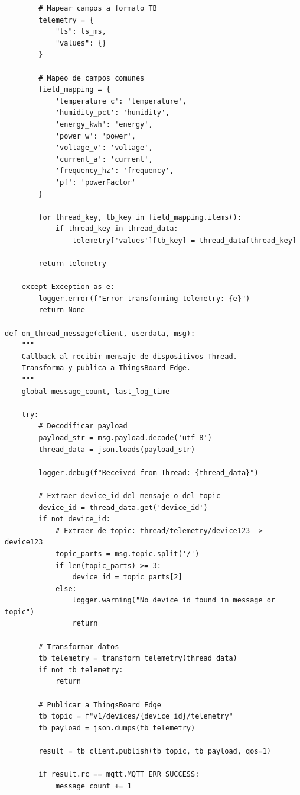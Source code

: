 \begin{verbatim}
        # Mapear campos a formato TB
        telemetry = {
            "ts": ts_ms,
            "values": {}
        }
        
        # Mapeo de campos comunes
        field_mapping = {
            'temperature_c': 'temperature',
            'humidity_pct': 'humidity',
            'energy_kwh': 'energy',
            'power_w': 'power',
            'voltage_v': 'voltage',
            'current_a': 'current',
            'frequency_hz': 'frequency',
            'pf': 'powerFactor'
        }
        
        for thread_key, tb_key in field_mapping.items():
            if thread_key in thread_data:
                telemetry['values'][tb_key] = thread_data[thread_key]
        
        return telemetry
    
    except Exception as e:
        logger.error(f"Error transforming telemetry: {e}")
        return None

def on_thread_message(client, userdata, msg):
    """
    Callback al recibir mensaje de dispositivos Thread.
    Transforma y publica a ThingsBoard Edge.
    """
    global message_count, last_log_time
    
    try:
        # Decodificar payload
        payload_str = msg.payload.decode('utf-8')
        thread_data = json.loads(payload_str)
        
        logger.debug(f"Received from Thread: {thread_data}")
        
        # Extraer device_id del mensaje o del topic
        device_id = thread_data.get('device_id')
        if not device_id:
            # Extraer de topic: thread/telemetry/device123 -> device123
            topic_parts = msg.topic.split('/')
            if len(topic_parts) >= 3:
                device_id = topic_parts[2]
            else:
                logger.warning("No device_id found in message or topic")
                return
        
        # Transformar datos
        tb_telemetry = transform_telemetry(thread_data)
        if not tb_telemetry:
            return
        
        # Publicar a ThingsBoard Edge
        tb_topic = f"v1/devices/{device_id}/telemetry"
        tb_payload = json.dumps(tb_telemetry)
        
        result = tb_client.publish(tb_topic, tb_payload, qos=1)
        
        if result.rc == mqtt.MQTT_ERR_SUCCESS:
            message_count += 1
            

\end{verbatim}
